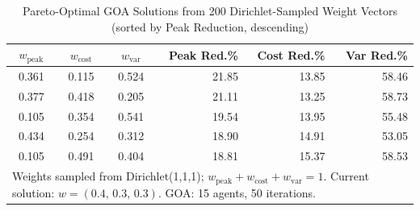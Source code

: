 \begin{table}[htbp]
\centering
\caption{Pareto-Optimal GOA Solutions from 200 Dirichlet-Sampled Weight Vectors (sorted by Peak Reduction, descending)}
\label{tab:pareto_front}
\begin{tabular}{cccrrr}
\hline
$w_\text{peak}$ & $w_\text{cost}$ & $w_\text{var}$ & \textbf{Peak Red.\%} & \textbf{Cost Red.\%} & \textbf{Var Red.\%} \\
\hline
0.361 & 0.115 & 0.524 & 21.85 & 13.85 & 58.46 \\
0.377 & 0.418 & 0.205 & 21.11 & 13.25 & 58.73 \\
0.105 & 0.354 & 0.541 & 19.54 & 13.95 & 55.48 \\
0.434 & 0.254 & 0.312 & 18.90 & 14.91 & 53.05 \\
0.105 & 0.491 & 0.404 & 18.81 & 15.37 & 58.53 \\
\hline
\multicolumn{6}{l}{\footnotesize Weights sampled from Dirichlet(1,1,1); $w_\text{peak}+w_\text{cost}+w_\text{var}=1$. Current solution: $w=(0.4,\,0.3,\,0.3)$. GOA: 15 agents, 50 iterations.} \\
\end{tabular}
\end{table}